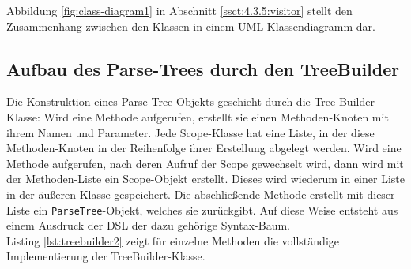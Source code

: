 \noindent
Abbildung \ref{fig:class-diagram1} in Abschnitt \ref{ssct:4.3.5:visitor} stellt den Zusammenhang zwischen den Klassen in einem UML-Klassendiagramm dar.

\subsection{Aufbau des Parse-Trees durch den TreeBuilder}\label{ssct:4.3.4:aufbau}
Die Konstruktion eines Parse-Tree-Objekts geschieht durch die Tree-Builder-Klasse: Wird eine Methode aufgerufen, erstellt sie einen Methoden-Knoten mit ihrem Namen und Parameter. Jede Scope-Klasse hat eine Liste, in der diese Methoden-Knoten in der Reihenfolge ihrer Erstellung abgelegt werden. Wird eine Methode aufgerufen, nach deren Aufruf der Scope gewechselt wird, dann wird mit der Methoden-Liste ein Scope-Objekt erstellt. Dieses wird wiederum in einer Liste in der äußeren Klasse gespeichert. Die abschließende Methode erstellt mit dieser Liste ein \texttt{ParseTree}-Objekt, welches sie zurückgibt. Auf diese Weise entsteht aus einem Ausdruck der DSL der dazu gehörige Syntax-Baum.\\
Listing \ref{lst:treebuilder2} zeigt für einzelne Methoden die vollständige Implementierung der TreeBuilder-Klasse.\\

